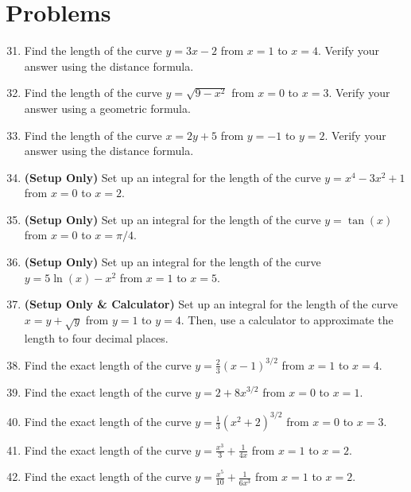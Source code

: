 \documentclass{article}
\begin{document}
\section*{Problems}
\begin{enumerate}
    \setcounter{enumi}{30}
    \item Find the length of the curve $y = 3x - 2$ from $x = 1$ to $x = 4$. Verify your answer using the distance formula.
    
    \item Find the length of the curve $y = \sqrt{9 - x^2}$ from $x = 0$ to $x = 3$. Verify your answer using a geometric formula.
    
    \item Find the length of the curve $x = 2y + 5$ from $y = -1$ to $y = 2$. Verify your answer using the distance formula.
    
    \item \textbf{(Setup Only)} Set up an integral for the length of the curve $y = x^4 - 3x^2 + 1$ from $x = 0$ to $x = 2$.
    
    \item \textbf{(Setup Only)} Set up an integral for the length of the curve $y = \tan(x)$ from $x = 0$ to $x = \pi/4$.
    
    \item \textbf{(Setup Only)} Set up an integral for the length of the curve $y = 5\ln(x) - x^2$ from $x = 1$ to $x = 5$.
    
    \item \textbf{(Setup Only \& Calculator)} Set up an integral for the length of the curve $x = y + \sqrt{y}$ from $y = 1$ to $y = 4$. Then, use a calculator to approximate the length to four decimal places.
    
    \item Find the exact length of the curve $y = \frac{2}{3}(x-1)^{3/2}$ from $x=1$ to $x=4$.
    
    \item Find the exact length of the curve $y = 2 + 8x^{3/2}$ from $x=0$ to $x=1$.
    
    \item Find the exact length of the curve $y = \frac{1}{3}(x^2+2)^{3/2}$ from $x=0$ to $x=3$.
    
    \item Find the exact length of the curve $y = \frac{x^3}{3} + \frac{1}{4x}$ from $x = 1$ to $x = 2$.
    
    \item Find the exact length of the curve $y = \frac{x^5}{10} + \frac{1}{6x^3}$ from $x=1$ to $x=2$.
    

\end{enumerate}
\end{document}
